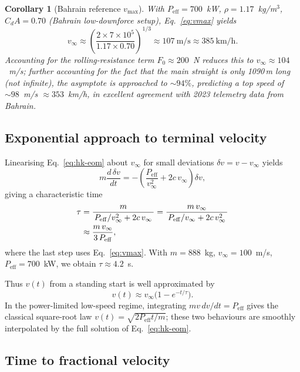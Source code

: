 \documentclass[11pt,twocolumn]{article}
\newtheorem{corollary}[theorem]{Corollary}
\theoremstyle{definition}
\theoremstyle{remark}
\begin{document}
\begin{corollary}[Bahrain reference $v_{\max}$]
With $P_{\mathrm{eff}} = 700$~kW, $\rho = 1.17$~kg/m$^3$,
$C_d A = 0.70$ (Bahrain low-downforce setup), Eq.~\eqref{eq:vmax} yields
\[
  v_\infty \approx \left(\frac{2 \times 7 \times 10^5}{1.17 \times 0.70}\right)^{1/3}
  \approx 107~\mathrm{m/s} \approx 385~\mathrm{km/h}.
\]
Accounting for the rolling-resistance term $F_0 \approx 200$~N reduces this to
$v_\infty \approx 104$~m/s; further accounting for the fact that the main
straight is only 1090\,m long (not infinite), the asymptote is approached to
$\sim 94\%$, predicting a top speed of $\sim 98$~m/s $\approx 353$~km/h, in
excellent agreement with 2023 telemetry data from Bahrain.
\end{corollary}

\subsection{Exponential approach to terminal velocity}

Linearising Eq.~\eqref{eq:hk-eom} about $v_\infty$ for small deviations
$\delta v = v - v_\infty$ yields
\begin{equation}
  m\frac{d\,\delta v}{dt} = -\left( \frac{P_{\mathrm{eff}}}{v_\infty^2} + 2 c\, v_\infty \right) \delta v,
\end{equation}
giving a characteristic time
\begin{align}
  \tau &= \frac{m}{\,P_{\mathrm{eff}}/v_\infty^2 + 2 c\, v_\infty\,}
  = \frac{m\, v_\infty}{\,P_{\mathrm{eff}}/v_\infty + 2 c\, v_\infty^2\,} \notag\\
  &\approx \frac{m\, v_\infty}{3\, P_{\mathrm{eff}}},
  \label{eq:tau}
\end{align}
where the last step uses Eq.~\eqref{eq:vmax}. With $m=888$~kg,
$v_\infty=100$~m/s, $P_{\mathrm{eff}}=700$~kW, we obtain $\tau \approx 4.2$~s.

Thus $v(t)$ from a standing start is well approximated by
\begin{equation}
  v(t) \approx v_\infty \bigl(1 - e^{-t/\tau}\bigr).
  \label{eq:approach}
\end{equation}
In the power-limited low-speed regime, integrating $m v\, dv/dt = P_{\mathrm{eff}}$
gives the classical square-root law $v(t) = \sqrt{2 P_{\mathrm{eff}} t / m}$;
these two behaviours are smoothly interpolated by the full solution of
Eq.~\eqref{eq:hk-eom}.

\subsection{Time to fractional velocity}
\end{document}
